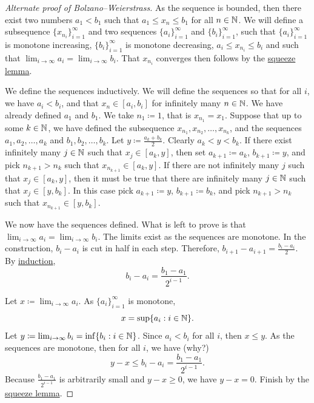 \begin{proof}[Alternate proof of Bolzano--Weierstrass]
As the sequence is bounded, then there exist two numbers $a_1 < b_1$
such that $a_1 \leq x_n \leq b_1$ for all $n \in {\mathbb{N}}$.
We will define a subsequence $\{ x_{n_i} \}_{i=1}^\infty$ and two
sequences $\{ a_i \}_{i=1}^\infty$ and $\{ b_i \}_{i=1}^\infty$, such that
$\{ a_i \}_{i=1}^\infty$ is monotone increasing, $\{ b_i \}_{i=1}^\infty$ is monotone decreasing,
$a_i \leq x_{n_i} \leq b_i$ and such that $\lim_{i\to\infty} a_i =
\lim_{i\to\infty} b_i$.   That
$x_{n_i}$ converges then follows by the \hyperref[squeeze:lemma]{squeeze lemma}.

We define the sequences inductively.  We will define the sequences so that
for all $i$, we have $a_i < b_i$,
and that $x_n \in [a_i,b_i]$ for infinitely many $n \in {\mathbb{N}}$.
We have already defined $a_1$ and $b_1$.  We take $n_1 \coloneqq 1$, that is
$x_{n_1} = x_1$.
Suppose that up to some $k \in {\mathbb{N}}$,
we have defined the subsequence $x_{n_1}, x_{n_2}, \ldots,
x_{n_k}$, and the sequences $a_1,a_2,\ldots,a_k$
and $b_1,b_2,\ldots,b_k$.
Let $y \coloneqq \frac{a_k+b_k}{2}$.
Clearly
$a_k < y < b_k$.  If there exist infinitely many $j \in {\mathbb{N}}$
such that $x_j \in [a_k,y]$, then set $a_{k+1} \coloneqq a_k$, $b_{k+1}
\coloneqq y$,
and pick $n_{k+1} > n_{k}$
such that $x_{n_{k+1}} \in [a_k,y]$.  If there are not infinitely many 
$j$ such that 
$x_j \in [a_k,y]$, then it must be true that there are infinitely many $j \in
{\mathbb{N}}$ such that 
$x_j \in [y,b_k]$.  In this case pick $a_{k+1} \coloneqq y$, $b_{k+1}
\coloneqq b_k$,
and pick $n_{k+1} > n_{k}$
such that $x_{n_{k+1}} \in [y,b_k]$.

We now have the sequences defined.  What is left to prove is that
$\lim_{i\to\infty} a_i = \lim_{i\to\infty} b_i$.  The limits exist as the sequences
are monotone.  In the construction,
$b_i - a_i$ is cut in half in each step.  Therefore,
$b_{i+1} - a_{i+1} = \frac{b_i-a_i}{2}$.  By
\hyperref[induction:thm]{induction},
\begin{equation*}
b_i - a_i = \frac{b_1-a_1}{2^{i-1}} .
\end{equation*}

Let $x \coloneqq \lim_{i\to\infty} a_i$.  As $\{ a_i \}_{i=1}^\infty$ is monotone,
\begin{equation*}
x = \sup \{ a_i : i \in {\mathbb{N}} \} .
\end{equation*}
Let $y \coloneqq \lim_{i\to\infty} b_i = \inf \{ b_i : i \in {\mathbb{N}} \}$.  Since $a_i < b_i$ for
all $i$, then $x \leq y$.
As the sequences are monotone, then
for all $i$, we have (why?)
\begin{equation*}
y-x \leq b_i-a_i = \frac{b_1-a_1}{2^{i-1}} .
\end{equation*}
Because $\frac{b_1-a_1}{2^{i-1}}$ is arbitrarily small and $y-x \geq 0$,
we have $y-x = 0$.  Finish by the \hyperref[squeeze:lemma]{squeeze lemma}.
\end{proof}

